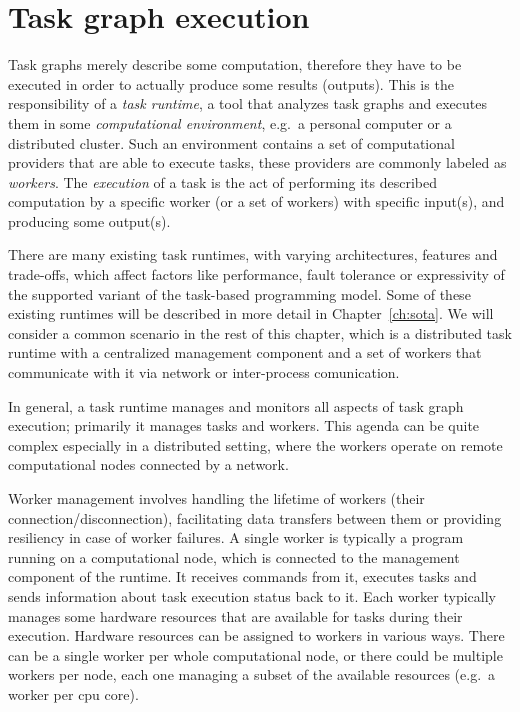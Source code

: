 \section{Task graph execution}
Task graphs merely describe some computation, therefore they have to be executed in order to
actually produce some results (outputs). This is the responsibility of a \emph{task runtime}, a
tool that analyzes task graphs and executes them in some \emph{computational environment}, e.g.\ a personal
computer or a distributed cluster. Such an environment contains a set of computational providers
that are able to execute tasks, these providers are commonly labeled as \emph{workers}. The
\emph{execution} of a task is the act of performing its described computation by a specific
worker (or a set of workers) with specific input(s), and producing some output(s).

There are many existing task runtimes, with varying architectures, features and trade-offs, which
affect factors like performance, fault tolerance or expressivity of the supported variant of the
task-based programming model. Some of these existing runtimes will be described in more detail in
Chapter~\ref{ch:sota}. We will consider a common scenario in the rest of this chapter,
which is a distributed task runtime with a centralized management component and a set of workers
that communicate with it via network or inter-process comunication.

In general, a task runtime manages and monitors all aspects of task graph execution; primarily it
manages tasks and workers. This agenda can be quite complex especially in a distributed setting,
where the workers operate on remote computational nodes connected by a network.

Worker management involves handling the lifetime of workers (their connection/disconnection),
facilitating data transfers between them or providing resiliency in case of worker failures. A
single worker is typically a program running on a computational node, which is connected to the
management component of the runtime. It receives commands from it, executes tasks and sends
information about task execution status back to it. Each worker typically manages some hardware
resources that are available for tasks during their execution. Hardware resources can be assigned
to workers in various ways. There can be a single worker per whole computational node, or there
could be multiple workers per node, each one managing a subset of the available resources (e.g.\ a
worker per \gls{cpu} core).

